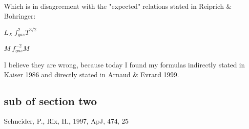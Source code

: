 \documentclass[preprint2]{aastex}
\begin{document}
Which is in disagreement with the "expected" relations stated in Reiprich
\& Bohringer: 

$L_X ~ f_{gas}^2 T^{3/2}$

$M ~ f_{gas}^{-2} M$

I believe they are wrong, because today I found my formulas
indirectly stated in Kaiser 1986 and directly stated in Arnaud \& Evrard
1999.



\subsection{sub of section two}

\acknowledgments


\begin{thebibliography}{}
 Schneider, P., Rix, H., 1997, ApJ, 474, 25
\end{thebibliography}
\end{document}
